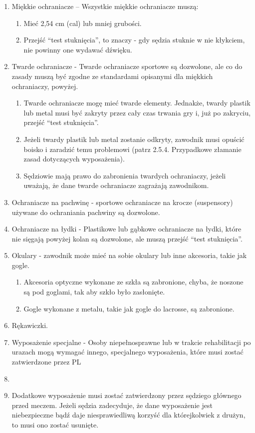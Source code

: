 \documentclass[12pt]{article}
\begin{document}
\begin{enumerate}
\item
    Miękkie ochraniacze -- Wszystkie miękkie ochraniacze muszą:
  
  \begin{enumerate}
  \item
        Mieć 2,54 cm (cal) lub mniej grubości.
      \item
        Przejść ``test stuknięcia'', to znaczy - gdy sędzia stuknie w nie
    kłykciem, nie powinny one wydawać dźwięku.
      \end{enumerate}
\item
    Twarde ochraniacze - Twarde ochraniacze sportowe są
  dozwolone, ale co do zasady muszą być zgodne ze standardami opisanymi
  dla miękkich ochraniaczy, powyżej.
  
  \begin{enumerate}
  \item
        Twarde ochraniacze mogę mieć twarde elementy. Jednakże, twardy
    plastik lub metal musi być zakryty przez cały czas trwania gry i,
    już po zakryciu, przejść ``test stuknięcia''.
      \item
        Jeżeli twardy plastik lub metal zostanie odkryty, zawodnik musi
    opuścić boisko i zaradzić temu problemowi (patrz 2.5.4. Przypadkowe
    złamanie zasad dotyczących wyposażenia).
      \item
        Sędziowie mają prawo do zabronienia twardych ochraniaczy, jeżeli
    uważają, że dane twarde ochraniacze zagrażają zawodnikom.
      \end{enumerate}
\item
    Ochraniacze na pachwinę - sportowe ochraniacze na krocze
  (suspensory) używane do ochraniania pachwiny są dozwolone.
  \item
    Ochraniacze na łydki - Plastikowe lub gąbkowe ochraniacze na
  łydki, które nie sięgają powyżej kolan są dozwolone, ale muszą przejść
  ``test stuknięcia''.
  \item
    Okulary - zawodnik może mieć na sobie okulary lub inne
  akcesoria, takie jak gogle.
  
  \begin{enumerate}
  \item
        Akcesoria optyczne wykonane ze szkła są zabronione, chyba, że
    noszone są pod goglami, tak aby szkło było zasłonięte.
      \item
        Gogle wykonane z metalu, takie jak gogle do lacrosse, są zabronione.
      \end{enumerate}
\item
    Rękawiczki.
  \item
    Wyposażenie specjalne - Osoby niepełnosprawne lub w trakcie
  rehabilitacji po urazach mogą wymagać innego, specjalnego wyposażenia,
  które musi zostać zatwierdzone przez PL\item
  \item
    Dodatkowe wyposażenie musi zostać zatwierdzony przez sędziego
  głównego przed meczem. Jeżeli sędzia zadecyduje, że dane wyposażenie
  jest niebezpieczne bądź daje niesprawiedliwą korzyść dla którejkolwiek
  z drużyn, to musi ono zostać usunięte.
  \end{enumerate}
\end{document}
